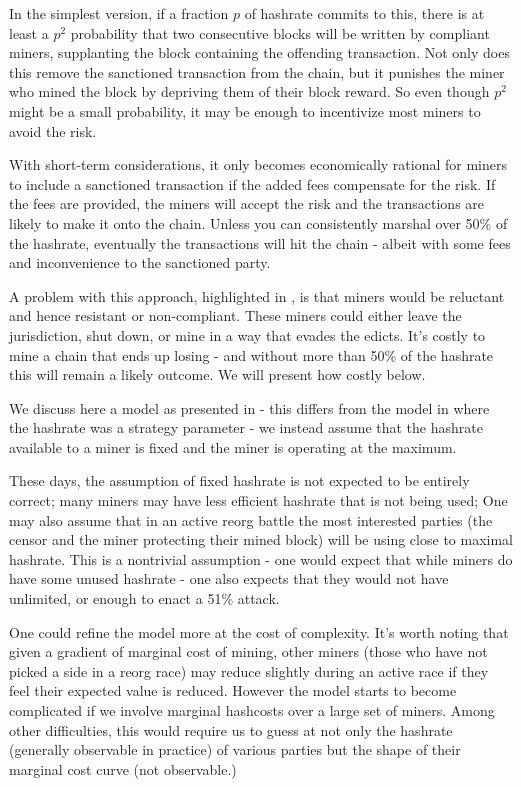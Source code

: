 \documentclass{article}%
\begin{document}
 In the simplest version, if a fraction $p$ of hashrate commits to this,
there is at least a $p^{2}$ probability that two consecutive blocks will be
written by compliant miners, supplanting the block containing the offending transaction.
 Not only does this remove the sanctioned transaction from the chain, but it
punishes the miner who mined the block by depriving them of their block
reward.  So even though $p^{2}$ might be a small probability, it may be
enough to incentivize most miners to avoid the risk.

 With short-term considerations, it only becomes economically rational for
miners to include a sanctioned transaction if the added fees compensate for the
risk.  If the fees are provided, the miners will accept the risk and the
transactions are likely to make it onto the chain.  Unless you can
consistently marshal over 50\% of the hashrate, eventually the transactions
will hit the chain - albeit with some fees and inconvenience to the sanctioned
party.

A problem with this approach, highlighted in \cite[pg 15]{HW}, is that miners
would be reluctant and hence resistant or non-compliant. These miners could
either leave the jurisdiction, shut down, or mine in a way that evades the
edicts.  It's costly to mine a chain that ends up losing - and without more
than 50\% of the hashrate this will remain a likely outcome.  We will
present how costly below.

We discuss here a model as presented in \cite[Chapter 5]{Warren23} - this
differs from the model in \cite{HW} where the hashrate was a strategy
parameter - we instead assume that the hashrate available to a miner is fixed and the miner is operating at the maximum.

These days, the assumption of fixed hashrate is not expected to be entirely
correct; many miners may have less efficient hashrate that is not being used;
One may also assume that in an active reorg battle the most interested parties
(the censor and the miner protecting their mined block) will be using close
to maximal hashrate. This is a nontrivial assumption - one would expect that
while miners do have some unused hashrate - one also expects that they would
not have unlimited, or enough to enact a 51\% attack.

 One could refine the model more at the cost of complexity.  It's worth
noting that given a gradient of marginal cost of mining, other miners (those
who have not picked a side in a reorg race) may reduce slightly during an
active race if they feel their expected value is reduced.  However the model starts
to become complicated if we involve marginal hashcosts over a large set of
miners.  Among other difficulties, this would require us to guess at not
only the hashrate (generally observable in practice) of various parties but
the shape of their marginal cost curve (not observable.)
\end{document}

